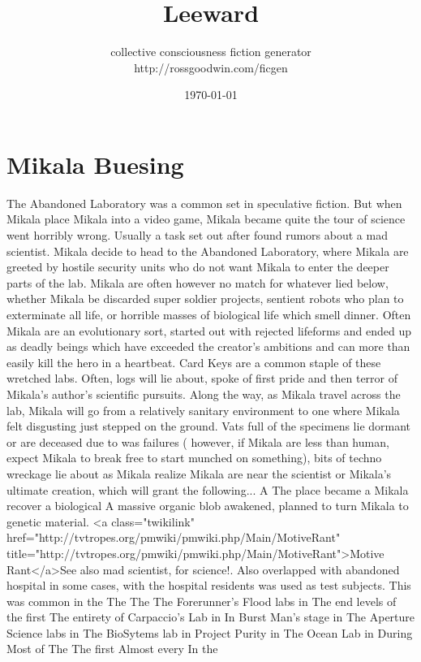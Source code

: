 \documentclass[12pt]{book}
\title{Leeward}
\author{collective consciousness fiction generator\\http://rossgoodwin.com/ficgen}
\date{\today}
\begin{document}
\maketitle



\chapter{Mikala Buesing}

The Abandoned Laboratory was a common set in speculative fiction. But when Mikala place Mikala into a video game, Mikala became quite the tour of science went horribly wrong. Usually a task set out after found rumors about a mad scientist. Mikala decide to head to the Abandoned Laboratory, where Mikala are greeted by hostile security units who do not want Mikala to enter the deeper parts of the lab. Mikala are often however no match for whatever lied below, whether Mikala be discarded super soldier projects, sentient robots who plan to exterminate all life, or horrible masses of biological life which smell dinner. Often Mikala are an evolutionary sort, started out with rejected lifeforms and ended up as deadly beings which have exceeded the creator's ambitions and can more than easily kill the hero in a heartbeat. Card Keys are a common staple of these wretched labs. Often, logs will lie about, spoke of first pride and then terror of Mikala's author's scientific pursuits. Along the way, as Mikala travel across the lab, Mikala will go from a relatively sanitary environment to one where Mikala felt disgusting just stepped on the ground. Vats full of the specimens lie dormant or are deceased due to was failures ( however, if Mikala are less than human, expect Mikala to break free to start munched on something), bits of techno wreckage lie about as Mikala realize Mikala are near the scientist or Mikala's ultimate creation, which will grant the following... A The place became a Mikala recover a biological A massive organic blob awakened, planned to turn Mikala to genetic material. <a class="twikilink" href="http://tvtropes.org/pmwiki/pmwiki.php/Main/MotiveRant" title="http://tvtropes.org/pmwiki/pmwiki.php/Main/MotiveRant">Motive Rant</a>See also mad scientist, for science!. Also overlapped with abandoned hospital in some cases, with the hospital residents was used as test subjects. This was common in the The The The Forerunner's Flood labs in The end levels of the first The entirety of Carpaccio's Lab in In Burst Man's stage in The Aperture Science labs in The BioSytems lab in Project Purity in The Ocean Lab in During Most of The The first Almost every In the
\end{document}
